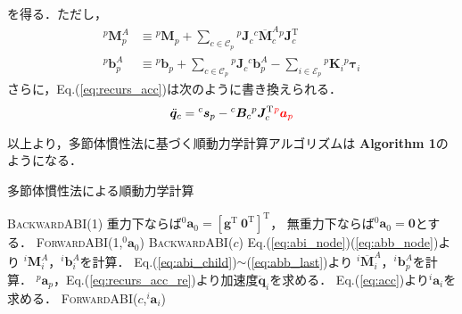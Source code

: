 ﻿\documentclass[a4paper]{jsarticle}
\begin{document}
を得る．ただし，
\begin{align}
{}^{p}\bm{M}^{A}_{p}
&\equiv {}^{p}\bm{M}_{p}
 +\sum_{c\in\mathcal{C}_{p}} {}^{p}\bm{J}_{c}{}^{c}\overline{\bm{M}}^{A}_{c}{}^{p}\bm{J}_{c}^{\mathrm{T}}
\label{eq:abi_node} \\
{}^{p}\bm{b}^{A}_{p}
&\equiv
 {}^{p}\bm{b}_{p}
 +\sum_{c\in\mathcal{C}_{p}} {}^{p}\bm{J}_{c}{}^{c}\bm{b}^{A}_{p}
 -\sum_{i\in\mathcal{E}_{p}}{}^{p}\bm{K}_{i}{}^{p}\bm{\tau}_{i}
\label{eq:abb_node}
\end{align}
さらに，Eq.(\ref{eq:recurs_acc})は次のように書き換えられる．
\begin{align}
\ddot{\bm{q}}_{c}={}^{c}\bm{s}_{p}-{}^{c}\bm{B}_{c}{}^{p}\bm{J}_{c}^{\mathrm{T}}\textcolor{red}{{}^{p}\bm{a}_{p}}
\label{eq:recurs_acc_re}
\end{align}

以上より，多節体慣性法に基づく順動力学計算アルゴリズムは
\textbf{Algorithm 1}のようになる．

\begin{algorithm}
\caption{多節体慣性法による順動力学計算}
\begin{algorithmic}[1]
 
\State \textsc{BackwardABI}(1) 
\State 
重力下ならば${}^{0}\bm{a}_{0}=[\bm{g}^{\mathrm{T}}~\bm{0}^{\mathrm{T}}]^{\mathrm{T}}$，
無重力下ならば${}^{0}\bm{a}_{0}=\bm{0}$とする．
\State \textsc{ForwardABI}(1,${}^{0}\bm{a}_{0}$) 
\EndProcedure
\Statex
{} 
  \State \textsc{BackwardABI}($c$) 
\EndFor
\State Eq.(\ref{eq:abi_node})(\ref{eq:abb_node})より
${}^{i}\bm{M}^{A}_{i}$，${}^{i}\bm{b}^{A}_{i}$を計算．
\State Eq.(\ref{eq:abi_child})$\sim$(\ref{eq:abb_last})より
${}^{i}\overline{\bm{M}}^{A}_{i}$，${}^{i}\bm{b}^{A}_{p}$を計算．
\EndProcedure
\Statex
{} 
\State ${}^{p}\bm{a}_{p}$，Eq.(\ref{eq:recurs_acc_re})より加速度$\ddot{\bm{q}}_{i}$を求める．
\State Eq.(\ref{eq:acc})より${}^{i}\bm{a}_{i}$を求める．
  \State \textsc{ForwardABI}($c$,${}^{i}\bm{a}_{i}$) 
\EndFor
\EndProcedure
\end{algorithmic}
\end{algorithm}
\end{document}
